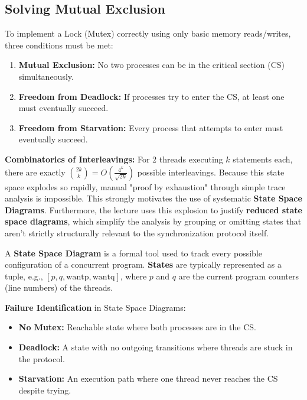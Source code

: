 \subsection{Solving Mutual Exclusion}

To implement a Lock (Mutex) correctly using only basic memory reads/writes, three conditions must be met:
\begin{enumerate}
    \item \textbf{Mutual Exclusion:} No two processes can be in the critical section (CS) simultaneously.
    \item \textbf{Freedom from Deadlock:} If processes try to enter the CS, at least one must eventually succeed.
    \item \textbf{Freedom from Starvation:} Every process that attempts to enter must eventually succeed.
\end{enumerate}

\begin{remark}
    \textbf{Combinatorics of Interleavings:} For 2 threads executing $k$ statements each, there are exactly $\binom{2k}{k} = O\left(\frac{4^k}{\sqrt{2k}}\right)$ possible interleavings.
    Because this state space explodes so rapidly, manual "proof by exhaustion" through simple trace analysis is impossible. This strongly motivates the use of systematic \textbf{State Space Diagrams}. Furthermore, the lecture uses this explosion to justify \textbf{reduced state space diagrams}, which simplify the analysis by grouping or omitting states that aren't strictly structurally relevant to the synchronization protocol itself.
\end{remark}

\begin{definition}
    A \textbf{State Space Diagram} is a formal tool used to track every possible configuration of a concurrent program.
    \textbf{States} are typically represented as a tuple, e.g., $[p, q, \text{wantp}, \text{wantq}]$, where $p$ and $q$ are the current program counters (line numbers) of the threads.
\end{definition}

\begin{important}
    \textbf{Failure Identification} in State Space Diagrams:
    \begin{itemize}
        \item \textbf{No Mutex:} Reachable state where both processes are in the CS.
        \item \textbf{Deadlock:} A state with no outgoing transitions where threads are stuck in the protocol.
        \item \textbf{Starvation:} An execution path where one thread never reaches the CS despite trying.
    \end{itemize}
\end{important}


